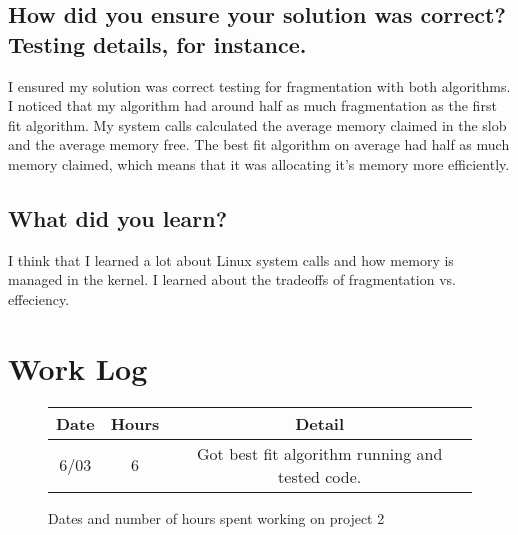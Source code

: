 \documentclass[journal,letterpaper,draftclsnofoot,onecolumn,10pt]{IEEEtran}
\begin{document}
\subsection{How did you ensure your solution was correct? Testing details, for instance.}
I ensured my solution was correct testing for fragmentation with both algorithms. I noticed that my algorithm had around half as much fragmentation as the first fit algorithm. My system calls calculated the average memory claimed in the slob and the average memory free. The best fit algorithm on average had half as much memory claimed, which means that it was allocating it's memory more efficiently.
\subsection{What did you learn?}
I think that I learned a lot about Linux system calls and how memory is managed in the kernel. I learned about the tradeoffs of fragmentation vs. effeciency.

\section{Work Log}

\begin{figure}[H]
   \begin{tabular}{c | c | c}
      Date & Hours & Detail\\
      \hline
      6/03 & 6 & Got best fit algorithm running and tested code.\\
      \hline
   \end{tabular}
   \caption{Dates and number of hours spent working on project 2}
\end{figure}
      
\end{document}
